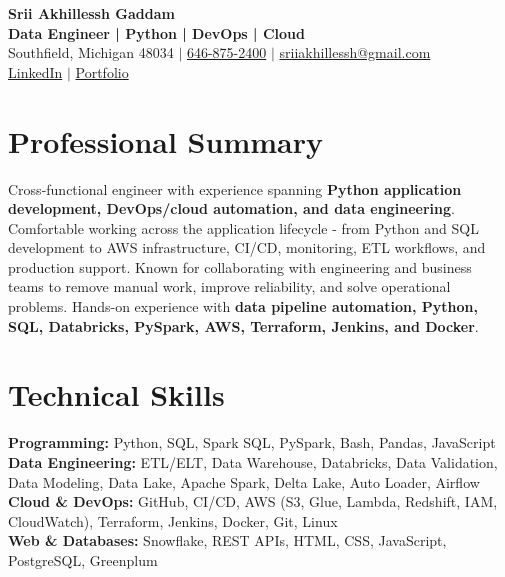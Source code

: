 \documentclass[letterpaper,10pt]{article}
\begin{document}
\fontsize{9.35pt}{10.45pt}\selectfont

\begin{center}
    {\LARGE \textbf{Srii Akhillessh Gaddam}} \\[-1pt]
    \textbf{Data Engineer | Python | DevOps | Cloud} \\[2pt]
    Southfield, Michigan 48034 $|$
    \href{tel:6468752400}{646-875-2400} $|$
    \href{mailto:sriiakhillessh@gmail.com}{sriiakhillessh@gmail.com} \\[1pt]
    \href{https://www.linkedin.com/in/srii-akhiilessh-gaddam-b48668191/}{LinkedIn} $|$
    \href{https://sriiakhillesshg.github.io/portfolio/}{Portfolio}
\end{center}
\vspace{-8pt}

\section{Professional Summary}
\small{Cross-functional engineer with experience spanning \textbf{Python application development, DevOps/cloud automation, and data engineering}. Comfortable working across the application lifecycle - from Python and SQL development to AWS infrastructure, CI/CD, monitoring, ETL workflows, and production support. Known for collaborating with engineering and business teams to remove manual work, improve reliability, and solve operational problems. Hands-on experience with \textbf{data pipeline automation, Python, SQL, Databricks, PySpark, AWS, Terraform, Jenkins, and Docker}.}

\section{Technical Skills}
\small{
\textbf{Programming:} Python, SQL, Spark SQL, PySpark, Bash, Pandas, JavaScript \\
\textbf{Data Engineering:} ETL/ELT, Data Warehouse, Databricks, Data Validation, Data Modeling, Data Lake, Apache Spark, Delta Lake, Auto Loader, Airflow \\
\textbf{Cloud \& DevOps:} GitHub, CI/CD, AWS (S3, Glue, Lambda, Redshift, IAM, CloudWatch), Terraform, Jenkins, Docker, Git, Linux \\
\textbf{Web \& Databases:} Snowflake, REST APIs, HTML, CSS, JavaScript, PostgreSQL, Greenplum
}
\end{document}
